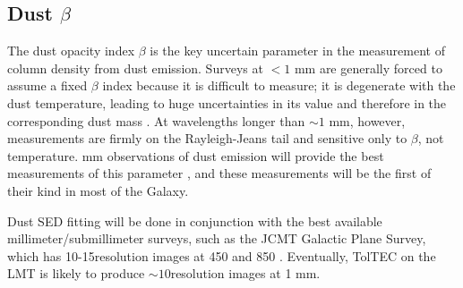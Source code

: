 \documentclass[11pt,preprint]{aastex_nofoot}
\begin{document}
\subsection{Dust $\beta$}
The dust opacity index $\beta$ is the key uncertain parameter in the measurement
of column density from dust emission.  Surveys at $<1$ mm are generally forced
to assume a fixed $\beta$ index because it is difficult to measure; it
is degenerate with the dust temperature, leading to huge uncertainties in its
value and therefore in the corresponding dust mass \citep{}.
At wavelengths longer than $\sim1$ mm, however, measurements are firmly
on the Rayleigh-Jeans tail and sensitive only to $\beta$, not temperature.
 mm observations of dust emission will provide the best
measurements of this parameter \citep{Schnee...}, and these measurements will
be the first of their kind in most of the Galaxy.


Dust SED fitting will be done in conjunction with the best available
millimeter/submillimeter surveys, such as the JCMT Galactic Plane Survey, which
has 10-15\arcsec resolution images at 450 and 850 \um.  Eventually, TolTEC 
on the LMT is likely to produce $\sim10$\arcsec resolution images at 1 mm.

\end{document}
